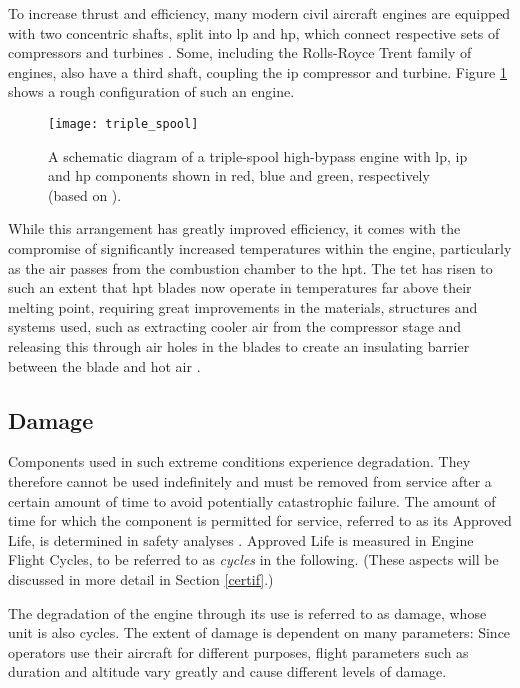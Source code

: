 To increase thrust and efficiency, many modern civil aircraft engines are equipped with two concentric shafts, split into \ac{lp} and \ac{hp}, which connect respective sets of compressors and turbines \cite{spittle_gas_2003}. Some, including the Rolls-Royce Trent family of engines, also have a third shaft, coupling the \ac{ip} compressor and turbine. Figure \ref{fig:triple_spool} shows a rough configuration of such an engine. 

\begin{figure}
    \centering
    \texttt{[image: triple\_spool]}
    \caption{\label{fig:triple_spool} A schematic diagram of a triple-spool high-bypass engine with \ac{lp}, \ac{ip} and \ac{hp} components shown in red, blue and green, respectively (based on \protect\cite{rolls-royce_plc_jet_2015}).}
\end{figure}


While this arrangement has greatly improved efficiency, it comes with the compromise of significantly increased temperatures within the engine, particularly as the air passes from the combustion chamber to the \ac{hpt}. The \ac{tet} has risen to such an extent that \ac{hpt} blades now operate in temperatures far above their melting point, requiring great improvements in the materials, structures and systems used, such as extracting cooler air from the compressor stage and releasing this through air holes in the blades to create an insulating barrier between the blade and hot air \cite{spittle_gas_2003}.

\subsection{Damage}
Components used in such extreme conditions experience degradation. They therefore cannot be used indefinitely and must be removed from service after a certain amount of time to avoid potentially catastrophic failure. The amount of time for which the component is permitted for service, referred to as its Approved Life, is determined in safety analyses \cite{easa_certification_2015}. Approved Life is measured in Engine Flight Cycles, to be referred to as \textit{cycles} in the following. (These aspects will be discussed in more detail in Section \ref{certif}.)

The degradation of the engine through its use is referred to as damage, whose unit is also cycles. The extent of damage is dependent on many parameters: Since operators use their aircraft for different purposes, flight parameters such as duration and altitude vary greatly and cause different levels of damage. 

